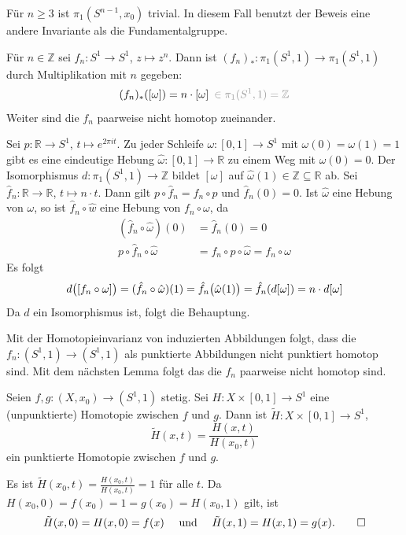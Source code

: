 Für $n \ge 3$ ist $\pi_1(S^{n-1}, x_0)$ trivial. 
In diesem Fall benutzt der Beweis eine andere Invariante als die Fundamentalgruppe.

\begin{proposition}[{name=[Abbildungen die Multiplikation auf Fundamentalgruppen induzieren]},label=prop:abbildungsgrad]
	Für $n \in \mathbb{Z}$ sei $f_n \colon S^1 \to S^1$, $z \mapsto z^n$.
	Dann ist $(f_n)_* \colon \pi_1(S^1, 1) \to \pi_1(S^1,1)$ durch Multiplikation mit $n$ gegeben:
	\[
		(f_n)_* ([\omega]) = n \cdot [\omega] \enspace {\color{light_gray}\in \pi_1\enbrace{S^1,1} = \mathbb{Z}}
	\]
	Weiter sind die $f_n$ paarweise nicht homotop zueinander.
\end{proposition}
\begin{beweis}
	Sei $p \colon \mathbb{R} \to S^1$, $t \mapsto e^{2 \pi  i t}$. 
	Zu jeder Schleife $\omega \colon [0,1] \to S^1$ mit $\omega(0)= \omega(1) = 1$ gibt es eine eindeutige Hebung
	\(
		\hat{\omega} \colon [0,1]  \to \mathbb{R}
	\)
	zu einem Weg mit $\hat{\omega}(0)=0$. 
	Der Isomorphismus $d \colon \pi_1(S^1,1) \to \mathbb{Z}$ bildet $[\omega]$ auf $\hat{\omega}(1) \in \mathbb{Z} \subseteq \mathbb{R}$ ab.
	Sei $\hat{f}_n \colon \mathbb{R} \to \mathbb{R}$, $t  \mapsto n \cdot t$. 
	Dann gilt $p \circ  \hat{f}_n = f_n \circ p$ und $\hat{f}_n (0)=0$. 
	Ist $\hat{\omega}$ eine Hebung von $\omega$, so ist $\hat{f}_n \circ \hat{w}$ eine Hebung von $f_n \circ \omega$, da
	\begin{align*}
		(\hat{f}_n \circ  \hat{\omega}) (0) &= \hat{f}_n (0) = 0 \\
		p \circ  \hat{f}_n \circ  \hat{\omega} &= f_n \circ p \circ  \hat{\omega} = f_n \circ  \omega
	\end{align*}
	Es folgt 
	\[
		d \enbrace[\big]{ [f_n \circ \omega]} = (\hat{f}_n \circ  \hat{\omega}) (1) = \hat{f}_n \enbrace[\big]{\hat{\omega}(1)} = \hat{f}_n (d[\omega]) = n \cdot d[\omega]
	\]
	Da $d$ ein Isomorphismus ist, folgt die Behauptung.
	
	Mit der Homotopieinvarianz von induzierten Abbildungen folgt, dass die $f_n \colon (S^1,1) \to (S^1,1)$ als punktierte Abbildungen nicht punktiert homotop sind. 
	Mit dem nächsten Lemma folgt das die $f_n$ paarweise nicht homotop sind.
\end{beweis}

\begin{lemma}[{name=[Konstruktion einer punktierten Homotopie aus einer nicht punktierten]}]
	Seien $f,g \colon (X,x_0) \to (S^1,1)$ stetig. 
	Sei $H \colon X \times [0,1] \to S^1$ eine (unpunktierte) Homotopie zwischen $f$ und $g$. 
	Dann ist $\tilde{H} \colon X \times [0,1]\to S^1$,
	\[
		\tilde{H} (x,t) = \frac{H(x,t)}{H(x_0, t)} 
	\]
	ein punktierte Homotopie zwischen $f$ und $g$.
\end{lemma}
\begin{beweis}
	Es ist 
	\(
		\tilde{H}(x_0,t) = \frac{H(x_0,t)}{H(x_0,t)} =1
	\)
	für alle $t$. Da $H(x_0,0) = f(x_0) = 1 = g(x_0) = H(x_0, 1)$ gilt, ist
	\[
		\tilde{H}(x,0) = H(x,0) = f(x) \quad \text{ und } \quad \tilde{H}(x,1) = H(x,1) = g(x). \qedhere
	\]
\end{beweis}

